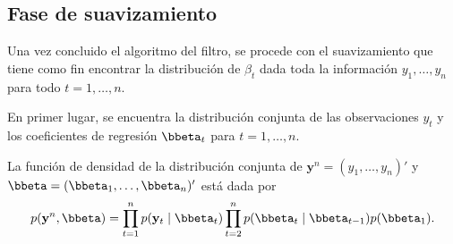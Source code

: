 \subsection{Fase de suavizamiento}
Una vez concluido el algoritmo del filtro, se procede con el suavizamiento que tiene como fin encontrar la distribución de $\beta_t$ dada toda la información $y_1,\ldots,y_n$ para todo $t=1,\ldots,n$.

En primer lugar, se encuentra la distribución conjunta de las observaciones $y_t$ y los coeficientes de regresión $\bbeta_t$ para $t=1,\ldots,n$.

\begin{Res}
La función de densidad de la distribución conjunta de $\mathbf{y}^n=(y_1,\ldots,y_n)'$ y $\bbeta=(\bbeta_1,\ldots,\bbeta_n)'$ está dada por
\begin{equation}
p(\mathbf{y}^n,\bbeta)=\prod_{t=1}^np(\mathbf{y}_t \mid \bbeta_t)\prod_{t=2}^np(\bbeta_t \mid \bbeta_{t-1})p(\bbeta_1).
\end{equation}
\end{Res}


